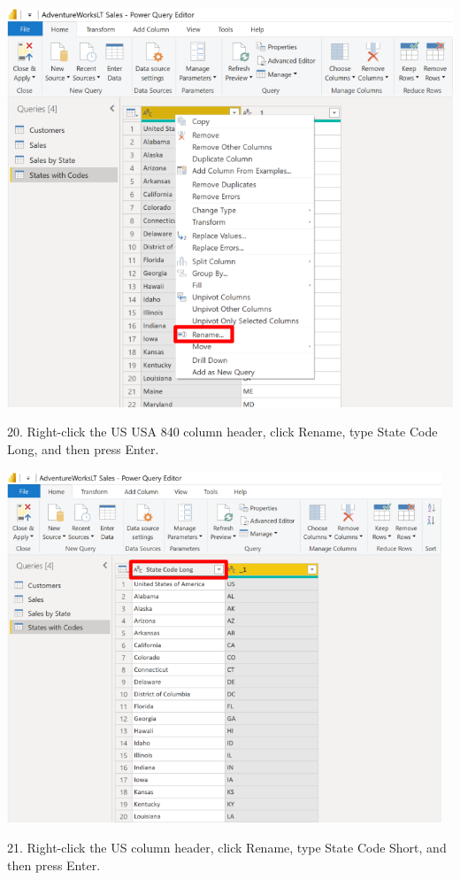 \documentclass[12pt,letterpaper]{article}
\begin{document}
\begin{center}
    \includegraphics[width=14cm]{img/59.png}
    \vspace{2cm}   
\end{center}
20. Right-click the US USA 840 column header, click Rename, type State Code Long, and then press Enter.
\begin{center}
    \includegraphics[width=13cm]{img/60.png}  
\end{center}
21. Right-click the US column header, click Rename, type State Code Short, and then press Enter.
\end{document}
